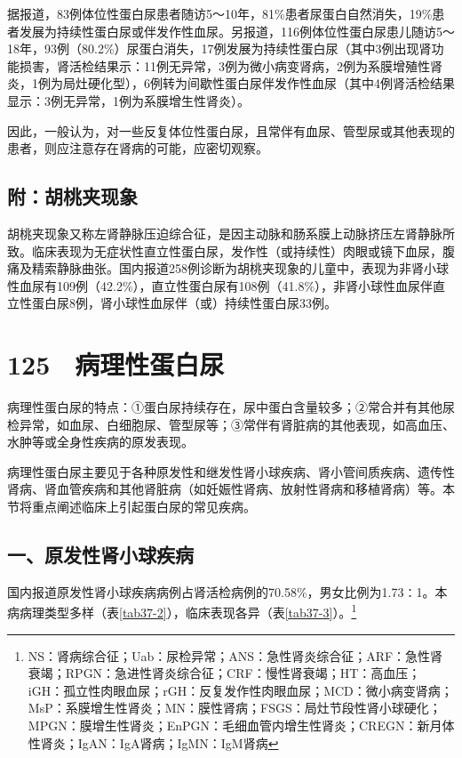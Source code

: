 据报道，83例体位性蛋白尿患者随访5～10年，81\%患者尿蛋白自然消失，19\%患者发展为持续性蛋白尿或伴发作性血尿。另报道，116例体位性蛋白尿患儿随访5～18年，93例（80.2\%）尿蛋白消失，17例发展为持续性蛋白尿（其中3例出现肾功能损害，肾活检结果示：11例无异常，3例为微小病变肾病，2例为系膜增殖性肾炎，1例为局灶硬化型），6例转为间歇性蛋白尿伴发作性血尿（其中4例肾活检结果显示：3例无异常，1例为系膜增生性肾炎）。

因此，一般认为，对一些反复体位性蛋白尿，且常伴有血尿、管型尿或其他表现的患者，则应注意存在肾病的可能，应密切观察。

\subsection{附：胡桃夹现象}

胡桃夹现象又称左肾静脉压迫综合征，是因主动脉和肠系膜上动脉挤压左肾静脉所致。临床表现为无症状性直立性蛋白尿，发作性（或持续性）肉眼或镜下血尿，腹痛及精索静脉曲张。国内报道258例诊断为胡桃夹现象的儿童中，表现为非肾小球性血尿有109例（42.2\%），直立性蛋白尿有108例（41.8\%），非肾小球性血尿伴直立性蛋白尿8例，肾小球性血尿伴（或）持续性蛋白尿33例。

\protect\hypertarget{text00291.html}{}{}

\section{125　病理性蛋白尿}

病理性蛋白尿的特点：①蛋白尿持续存在，尿中蛋白含量较多；②常合并有其他尿检异常，如血尿、白细胞尿、管型尿等；③常伴有肾脏病的其他表现，如高血压、水肿等或全身性疾病的原发表现。

病理性蛋白尿主要见于各种原发性和继发性肾小球疾病、肾小管间质疾病、遗传性肾病、肾血管疾病和其他肾脏病（如妊娠性肾病、放射性肾病和移植肾病）等。本节将重点阐述临床上引起蛋白尿的常见疾病。

\subsection{一、原发性肾小球疾病}

国内报道原发性肾小球疾病病例占肾活检病例的70.58\%，男女比例为1.73∶1。本病病理类型多样（表\ref{tab37-2}），临床表现各异（表\ref{tab37-3}）。\footnote{NS：肾病综合征；Uab：尿检异常；ANS：急性肾炎综合征；ARF：急性肾衰竭；RPGN：急进性肾炎综合征；CRF：慢性肾衰竭；HT：高血压；iGH：孤立性肉眼血尿；rGH：反复发作性肉眼血尿；MCD：微小病变肾病；MsP：系膜增生性肾炎；MN：膜性肾病；FSGS：局灶节段性肾小球硬化；MPGN：膜增生性肾炎；EnPGN：毛细血管内增生性肾炎；CREGN：新月体性肾炎；IgAN：IgA肾病；IgMN：IgM肾病}

